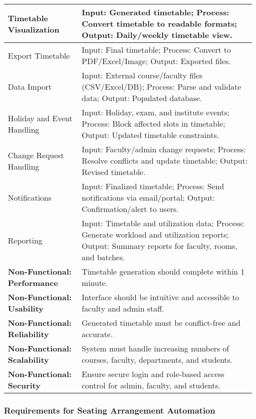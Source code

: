 \documentclass[12pt]{article}
\begin{document}
\begin{longtable}{|p{4cm}|p{11cm}|}
Timetable Visualization & Input: Generated timetable; Process: Convert timetable to readable formats; Output: Daily/weekly timetable view. \\ 
\hline 

Export Timetable & Input: Final timetable; Process: Convert to PDF/Excel/Image; Output: Exported files. \\ 
\hline 

Data Import & Input: External course/faculty files (CSV/Excel/DB); Process: Parse and validate data; Output: Populated database. \\ 
\hline 

Holiday and Event Handling & Input: Holiday, exam, and institute events; Process: Block affected slots in timetable; Output: Updated timetable constraints. \\ 
\hline 

Change Request Handling & Input: Faculty/admin change requests; Process: Resolve conflicts and update timetable; Output: Revised timetable. \\ 
\hline 

Notifications & Input: Finalized timetable; Process: Send notifications via email/portal; Output: Confirmation/alert to users. \\ 
\hline 

Reporting & Input: Timetable and utilization data; Process: Generate workload and utilization reports; Output: Summary reports for faculty, rooms, and batches. \\ 
\hline

\textbf{Non-Functional: Performance} & Timetable generation should complete within 1 minute. \\ 
\hline
\textbf{Non-Functional: Usability} & Interface should be intuitive and accessible to faculty and admin staff. \\ 
\hline
\textbf{Non-Functional: Reliability} & Generated timetable must be conflict-free and accurate. \\ 
\hline
\textbf{Non-Functional: Scalability} & System must handle increasing numbers of courses, faculty, departments, and students. \\ 
\hline
\textbf{Non-Functional: Security} & Ensure secure login and role-based access control for admin, faculty, and students. \\ 
\hline

\end{longtable}


\subsubsection{Requirements for Seating Arrangement Automation}
\end{document}
